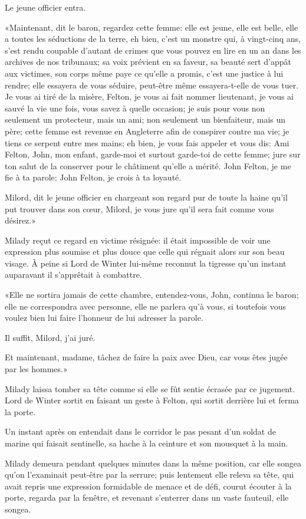 Le jeune officier entra. 

«Maintenant, dit le baron, regardez cette femme: elle est jeune, elle est belle, elle a toutes les séductions de la terre, eh bien, c'est un monstre qui, à vingt-cinq ans, s'est rendu coupable d'autant de crimes que vous pouvez en lire en un an dans les archives de nos tribunaux; sa voix prévient en sa faveur, sa beauté sert d'appât aux victimes, son corps même paye ce qu'elle a promis, c'est une justice à lui rendre; elle essayera de vous séduire, peut-être même essayera-t-elle de vous tuer. Je vous ai tiré de la misère, Felton, je vous ai fait nommer lieutenant, je vous ai sauvé la vie une fois, vous savez à quelle occasion; je suis pour vous non seulement un protecteur, mais un ami; non seulement un bienfaiteur, mais un père; cette femme est revenue en Angleterre afin de conspirer contre ma vie; je tiens ce serpent entre mes mains; eh bien, je vous fais appeler et vous dis: Ami Felton, John, mon enfant, garde-moi et surtout garde-toi de cette femme; jure sur ton salut de la conserver pour le châtiment qu'elle a mérité. John Felton, je me fie à ta parole; John Felton, je crois à ta loyauté. 

\speak  Milord, dit le jeune officier en chargeant son regard pur de toute la haine qu'il put trouver dans son cœur, Milord, je vous jure qu'il sera fait comme vous désirez.» 

Milady reçut ce regard en victime résignée: il était impossible de voir une expression plus soumise et plus douce que celle qui régnait alors sur son beau visage. À peine si Lord de Winter lui-même reconnut la tigresse qu'un instant auparavant il s'apprêtait à combattre. 

«Elle ne sortira jamais de cette chambre, entendez-vous, John, continua le baron; elle ne correspondra avec personne, elle ne parlera qu'à vous, si toutefois vous voulez bien lui faire l'honneur de lui adresser la parole. 

\speak  Il suffit, Milord, j'ai juré. 

\speak  Et maintenant, madame, tâchez de faire la paix avec Dieu, car vous êtes jugée par les hommes.» 

Milady laissa tomber sa tête comme si elle se fût sentie écrasée par ce jugement. Lord de Winter sortit en faisant un geste à Felton, qui sortit derrière lui et ferma la porte. 

Un instant après on entendait dans le corridor le pas pesant d'un soldat de marine qui faisait sentinelle, sa hache à la ceinture et son mousquet à la main. 

Milady demeura pendant quelques minutes dans la même position, car elle songea qu'on l'examinait peut-être par la serrure; puis lentement elle releva sa tête, qui avait repris une expression formidable de menace et de défi, courut écouter à la porte, regarda par la fenêtre, et revenant s'enterrer dans un vaste fauteuil, elle songea.